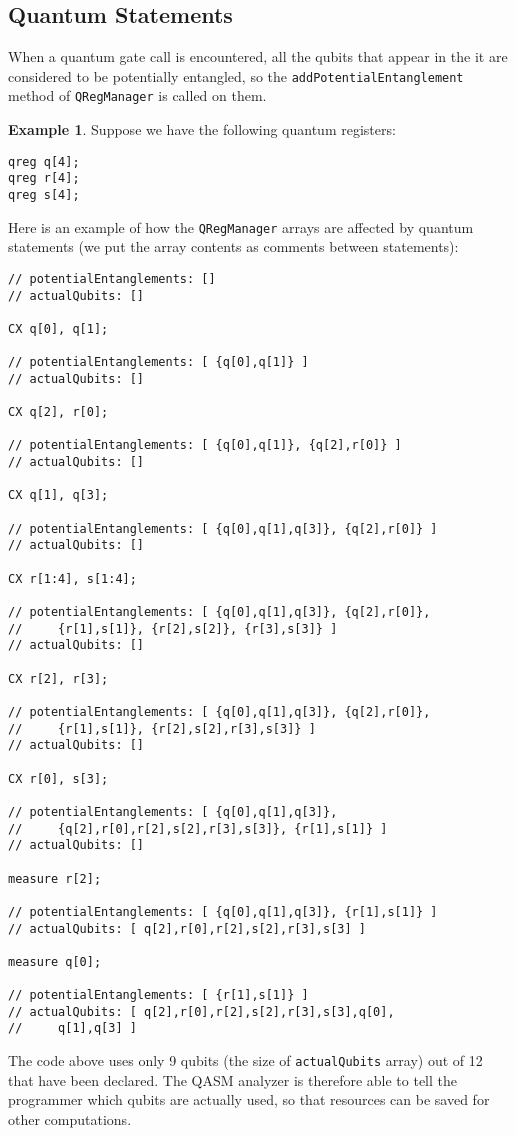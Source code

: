 \documentclass[12pt,a4paper]{report}
\theoremstyle{definition}
\theoremstyle{definition}
\newtheorem{example}{Example}[section]
\theoremstyle{definition}
\begin{document}
\pagebreak
\subsection{Quantum Statements}
When a quantum gate call is encountered, all the qubits that appear in the it are considered to be potentially entangled, so the \texttt{addPotentialEntanglement} method of \texttt{QRegManager} is called on them.
\begin{example}
Suppose we have the following quantum registers:
\begin{lstlisting}
qreg q[4];
qreg r[4];
qreg s[4];
\end{lstlisting}
Here is an example of how the \texttt{QRegManager} arrays are affected by quantum statements (we put the array contents as comments between statements):
\begin{lstlisting}
// potentialEntanglements: []
// actualQubits: []

CX q[0], q[1];

// potentialEntanglements: [ {q[0],q[1]} ]
// actualQubits: []

CX q[2], r[0];

// potentialEntanglements: [ {q[0],q[1]}, {q[2],r[0]} ]
// actualQubits: []

CX q[1], q[3];

// potentialEntanglements: [ {q[0],q[1],q[3]}, {q[2],r[0]} ]
// actualQubits: []

CX r[1:4], s[1:4];

// potentialEntanglements: [ {q[0],q[1],q[3]}, {q[2],r[0]},
//     {r[1],s[1]}, {r[2],s[2]}, {r[3],s[3]} ]
// actualQubits: []

CX r[2], r[3];

// potentialEntanglements: [ {q[0],q[1],q[3]}, {q[2],r[0]},
//     {r[1],s[1]}, {r[2],s[2],r[3],s[3]} ]
// actualQubits: []

CX r[0], s[3];

// potentialEntanglements: [ {q[0],q[1],q[3]},
//     {q[2],r[0],r[2],s[2],r[3],s[3]}, {r[1],s[1]} ]
// actualQubits: []

measure r[2];

// potentialEntanglements: [ {q[0],q[1],q[3]}, {r[1],s[1]} ]
// actualQubits: [ q[2],r[0],r[2],s[2],r[3],s[3] ]

measure q[0];

// potentialEntanglements: [ {r[1],s[1]} ]
// actualQubits: [ q[2],r[0],r[2],s[2],r[3],s[3],q[0],
//     q[1],q[3] ]
\end{lstlisting}

The code above uses only 9 qubits (the size of \texttt{actualQubits} array) out of 12 that have been declared. The QASM analyzer is therefore able to tell the programmer which qubits are actually used, so that resources can be saved for other computations.
\end{example}
\pagebreak
\end{document}
